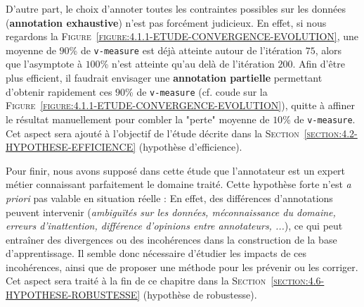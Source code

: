 			D'autre part, le choix d'annoter toutes les contraintes possibles sur les données (\textbf{annotation exhaustive}) n'est pas forcément judicieux.
			En effet, si nous regardons la \textsc{Figure~\ref{figure:4.1.1-ETUDE-CONVERGENCE-EVOLUTION}}, une moyenne de $90$\% de \texttt{v-measure} est déjà atteinte autour de l'itération $75$, alors que l'asymptote à $100$\% n'est atteinte qu'au delà de l'itération $200$.
			Afin d'être plus efficient, il faudrait envisager une \textbf{annotation partielle} permettant d'obtenir rapidement ces $90$\% de \texttt{v-measure} (cf. coude sur la \textsc{Figure~\ref{figure:4.1.1-ETUDE-CONVERGENCE-EVOLUTION}}), quitte à affiner le résultat manuellement pour combler la "perte" moyenne de $10$\% de \texttt{v-measure}.
			Cet aspect sera ajouté à l'objectif de l'étude décrite dans la \textsc{Section~\ref{section:4.2-HYPOTHESE-EFFICIENCE}} (hypothèse d'efficience).
			
			Pour finir, nous avons supposé dans cette étude que l'annotateur est un expert métier connaissant parfaitement le domaine traité.
			Cette hypothèse forte n'est \textit{a priori} pas valable en situation réelle : En effet, des différences d'annotations peuvent intervenir (\textit{ambiguïtés sur les données, méconnaissance du domaine, erreurs d'inattention, différence d'opinions entre annotateurs, ...}), ce qui peut entraîner des divergences ou des incohérences dans la construction de la base d'apprentissage.
			Il semble donc nécessaire d'étudier les impacts de ces incohérences, ainsi que de proposer une méthode pour les prévenir ou les corriger.
			Cet aspect sera traité à la fin de ce chapitre dans la \textsc{Section~\ref{section:4.6-HYPOTHESE-ROBUSTESSE}} (hypothèse de robustesse).